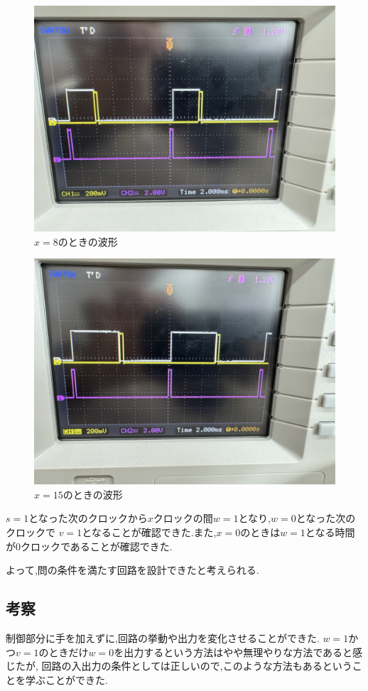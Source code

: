 \documentclass[autodetect-engine, dvi=dvipdfmx, 10pt, a4paper, ja=standard]{bxjsarticle}
\begin{document}
\begin{figure}[H]
	\centering
	\includegraphics[width=0.8\columnwidth]{asset/ex6b_x_8.jpeg}
	\caption{$x = 8$のときの波形}
	\label{fig:ex6b-osc-8}
\end{figure}

\begin{figure}[H]
	\centering
	\includegraphics[width=0.8\columnwidth]{asset/ex6b_x_15.jpeg}
	\caption{$x = 15$のときの波形}
	\label{fig:ex6b-osc-15}
\end{figure}

$s = 1$となった次のクロックから$x$クロックの間$w = 1$となり,$w = 0$となった次のクロックで
$v = 1$となることが確認できた.また,$x = 0$のときは$w = 1$となる時間が0クロックであることが確認できた.

よって,問の条件を満たす回路を設計できたと考えられる.

\subsection{考察}
制御部分に手を加えずに,回路の挙動や出力を変化させることができた.
$w = 1$かつ$v = 1$のときだけ$w = 0$を出力するという方法はやや無理やりな方法であると感じたが,
回路の入出力の条件としては正しいので,このような方法もあるということを学ぶことができた.
\end{document}
